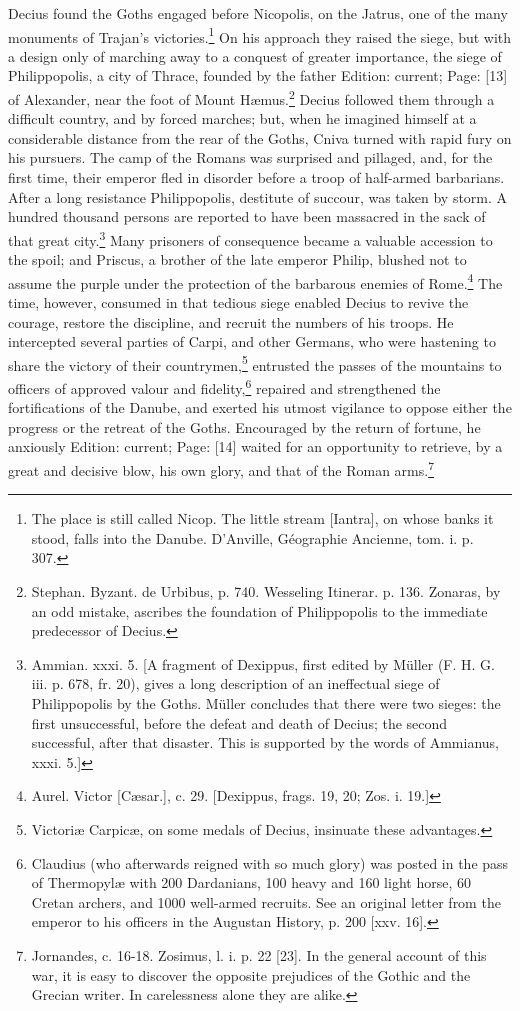 Decius found the Goths engaged before Nicopolis, on the Jatrus, one of the many monuments of Trajan\texthebrew{}’s victories.\footnote{The place is still called Nicop. The little stream [Iantra], on whose banks it stood, falls into the Danube. D\texthebrew{}’Anville, Géographie Ancienne, tom. i. p. 307.} On his approach they raised the siege, but with a design only of marching away to a conquest of greater importance, the siege of Philippopolis, a city of Thrace, founded by the father Edition: current; Page: [13] of Alexander, near the foot of Mount Hæmus.\footnote{Stephan. Byzant. de Urbibus, p. 740. Wesseling Itinerar. p. 136. Zonaras, by an odd mistake, ascribes the foundation of Philippopolis to the immediate predecessor of Decius.} Decius followed them through a difficult country, and by forced marches; but, when he imagined himself at a considerable distance from the rear of the Goths, Cniva turned with rapid fury on his pursuers. The camp of the Romans was surprised and pillaged, and, for the first time, their emperor fled in disorder before a troop of half-armed barbarians. After a long resistance Philippopolis, destitute of succour, was taken by storm. A hundred thousand persons are reported to have been massacred in the sack of that great city.\footnote{Ammian. xxxi. 5. [A fragment of Dexippus, first edited by Müller (F. H. G. iii. p. 678, fr. 20), gives a long description of an ineffectual siege of Philippopolis by the Goths. Müller concludes that there were two sieges: the first unsuccessful, before the defeat and death of Decius; the second successful, after that disaster. This is supported by the words of Ammianus, xxxi. 5.]} Many prisoners of consequence became a valuable accession to the spoil; and Priscus, a brother of the late emperor Philip, blushed not to assume the purple under the protection of the barbarous enemies of Rome.\footnote{Aurel. Victor [Cæsar.], c. 29. [Dexippus, frags. 19, 20; Zos. i. 19.]} The time, however, consumed in that tedious siege enabled Decius to revive the courage, restore the discipline, and recruit the numbers of his troops. He intercepted several parties of Carpi, and other Germans, who were hastening to share the victory of their countrymen,\footnote{Victoriæ Carpicæ, on some medals of Decius, insinuate these advantages.} entrusted the passes of the mountains to officers of approved valour and fidelity,\footnote{Claudius (who afterwards reigned with so much glory) was posted in the pass of Thermopylæ with 200 Dardanians, 100 heavy and 160 light horse, 60 Cretan archers, and 1000 well-armed recruits. See an original letter from the emperor to his officers in the Augustan History, p. 200 [xxv. 16].} repaired and strengthened the fortifications of the Danube, and exerted his utmost vigilance to oppose either the progress or the retreat of the Goths. Encouraged by the return of fortune, he anxiously Edition: current; Page: [14] waited for an opportunity to retrieve, by a great and decisive blow, his own glory, and that of the Roman arms.\footnote{Jornandes, c. 16-18. Zosimus, l. i. p. 22 [23]. In the general account of this war, it is easy to discover the opposite prejudices of the Gothic and the Grecian writer. In carelessness alone they are alike.}


